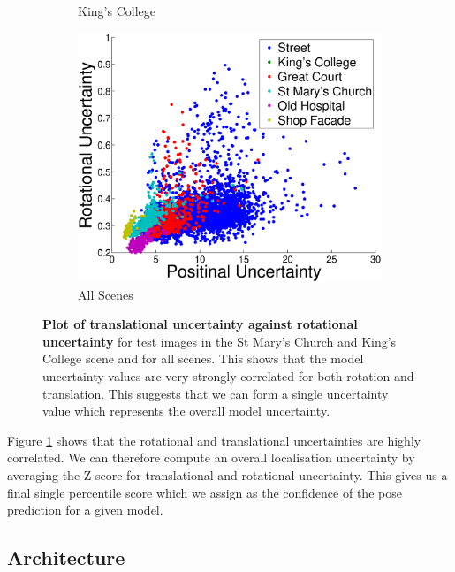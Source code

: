 \begin{figure}[t]
\begin{center}
{\begin{subfigure}[b]{0.33\linewidth}
        \caption{King's College}
    \end{subfigure}
    	\begin{subfigure}[b]{0.33\linewidth}
        \includegraphics[width=\linewidth]{Uncertainty/positional_uncertainty_vs_rotational_uncertainty.eps}
        \caption{All Scenes}
    \end{subfigure}
    }
\end{center}
   \caption[Translational uncertainty against rotational uncertainty.]{\textbf{Plot of translational uncertainty against rotational uncertainty} for test images in the St Mary's Church and King's College scene and for all scenes. This shows that the model uncertainty values are very strongly correlated for both rotation and translation. This suggests that we can form a single uncertainty value which represents the overall model uncertainty.}
\label{fig:unc_v_unc}
\end{figure}

Figure \ref{fig:unc_v_unc} shows that the rotational and translational uncertainties are highly correlated. We can therefore compute an overall localisation uncertainty by averaging the Z-score for translational and rotational uncertainty. This gives us a final single percentile score which we assign as the confidence of the pose prediction for a given model.

\subsection{Architecture}
\label{ch:arch}

